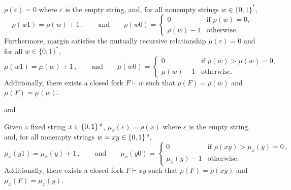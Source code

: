 \begin{lemma}\label{lem:margin-old} 
  $\rho(\varepsilon) = 0$ 
  where $\varepsilon$ is the empty string, and, for all nonempty strings $w\in\{0,1\}^*$,
  \begin{equation}
    \rho(w1) = \rho(w)+1\,, \qquad\text{and}\qquad
    \rho(w0) = \begin{cases} 0 & \text{if $\rho(w) = 0$,}\\
      \rho(w)-1 & \text{otherwise.}
    \end{cases}
    \label{eq:rho-recursive}
  \end{equation}
  Furthermore, margin satisfies the mutually recursive relationship
  $\mu(\varepsilon) = 0$ and for all $w \in \{0,1\}^*$,
  \begin{equation}
    \mu(w1) = \mu(w)+1\,,\qquad\text{and}\qquad
    \mu(w0) = \begin{cases}
      0 & \text{if $\rho(w)>\mu(w)=0$,} \\
      \mu(w)-1 & \text{otherwise.}
    \end{cases}
    \label{eq:mu-recursive}
  \end{equation}
  Additionally, there exists a closed fork $F\vdash w$ such that
  $\rho(F)=\rho(w)$ and $\mu(F)=\mu(w)$.
\end{lemma}

and

\begin{lemma}\label{lem:relative-margin-old}
  Given a fixed string $x\in\{0,1\}\text{\emph{*}}$,
  $\mu_x(\varepsilon) =\rho(x)$ 
  where $\varepsilon$ is the empty string, and, for all nonempty strings $w=xy\in\{0,1\}\text{\emph{*}},$
  \begin{equation}
    \mu_x(y1)= \mu_x(y)+1\,,\qquad\text{and}\qquad
    \mu_x(y0)= \begin{cases}
      0 & \text{if } \rho(xy) > \mu_x(y)=0\,, \\
      \mu_x(y)-1 & \text{otherwise.}
    \end{cases}
    \label{eq:mu-relative-recursive}
  \end{equation}
  Additionally, there exists a closed fork $F\vdash xy$ such that
  $\rho(F)=\rho(xy)$ and $\mu_x(F)=\mu_x(y)$.
\end{lemma}


